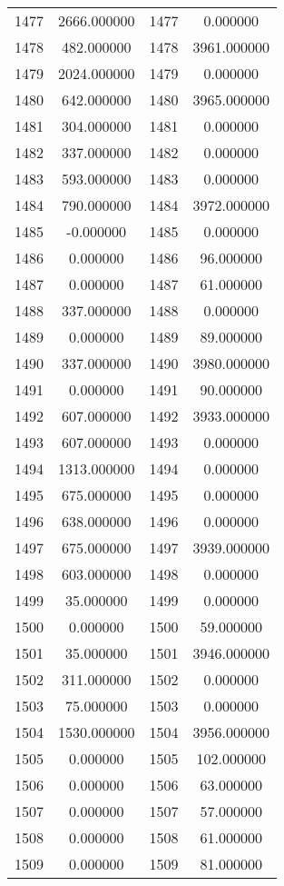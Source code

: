\documentclass[12pt]{article}
\begin{document}
\begin{longtable}{@{}cccc@{}}
1477 & 2666.000000 & 1477 & 0.000000 \\
1478 & 482.000000 & 1478 & 3961.000000 \\
1479 & 2024.000000 & 1479 & 0.000000 \\
1480 & 642.000000 & 1480 & 3965.000000 \\
1481 & 304.000000 & 1481 & 0.000000 \\
1482 & 337.000000 & 1482 & 0.000000 \\
1483 & 593.000000 & 1483 & 0.000000 \\
1484 & 790.000000 & 1484 & 3972.000000 \\
1485 & -0.000000 & 1485 & 0.000000 \\
1486 & 0.000000 & 1486 & 96.000000 \\
1487 & 0.000000 & 1487 & 61.000000 \\
1488 & 337.000000 & 1488 & 0.000000 \\
1489 & 0.000000 & 1489 & 89.000000 \\
1490 & 337.000000 & 1490 & 3980.000000 \\
1491 & 0.000000 & 1491 & 90.000000 \\
1492 & 607.000000 & 1492 & 3933.000000 \\
1493 & 607.000000 & 1493 & 0.000000 \\
1494 & 1313.000000 & 1494 & 0.000000 \\
1495 & 675.000000 & 1495 & 0.000000 \\
1496 & 638.000000 & 1496 & 0.000000 \\
1497 & 675.000000 & 1497 & 3939.000000 \\
1498 & 603.000000 & 1498 & 0.000000 \\
1499 & 35.000000 & 1499 & 0.000000 \\
1500 & 0.000000 & 1500 & 59.000000 \\
1501 & 35.000000 & 1501 & 3946.000000 \\
1502 & 311.000000 & 1502 & 0.000000 \\
1503 & 75.000000 & 1503 & 0.000000 \\
1504 & 1530.000000 & 1504 & 3956.000000 \\
1505 & 0.000000 & 1505 & 102.000000 \\
1506 & 0.000000 & 1506 & 63.000000 \\
1507 & 0.000000 & 1507 & 57.000000 \\
1508 & 0.000000 & 1508 & 61.000000 \\
1509 & 0.000000 & 1509 & 81.000000 \\

\end{longtable}
\end{document}
